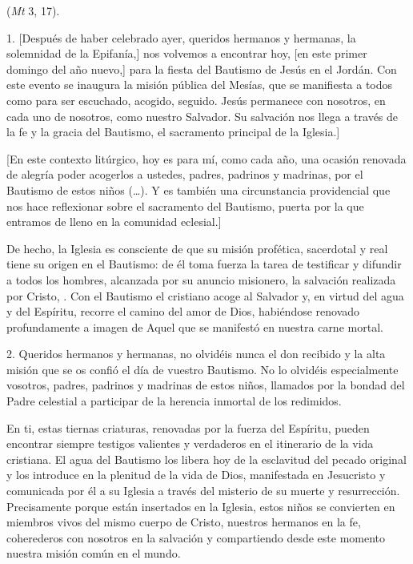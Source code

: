 				\begin{body}
					 (\emph{Mt} 3, 17).
					
					1. {[}Después de haber celebrado ayer, queridos hermanos y hermanas, la solemnidad de la Epifanía,{]} nos volvemos a encontrar hoy, {[}en este primer domingo del año nuevo,{]} para la fiesta del Bautismo de Jesús en el Jordán. Con este evento se inaugura la misión pública del Mesías, que se manifiesta a todos como  para ser escuchado, acogido, seguido. Jesús permanece con nosotros, en cada uno de nosotros, como nuestro Salvador. Su salvación nos llega a través de la fe y la gracia del Bautismo, el sacramento principal de la Iglesia.{]}
					
					{[}En este contexto litúrgico, hoy es para mí, como cada año, una ocasión renovada de alegría poder acogerlos a ustedes, padres, padrinos y madrinas, por el Bautismo de estos niños (\ldots{}). Y es también una circunstancia providencial que nos hace reflexionar sobre el sacramento del Bautismo, puerta por la que entramos de lleno en la comunidad eclesial.{]}
					
					De hecho, la Iglesia es consciente de que su misión profética, sacerdotal y real tiene su origen en el Bautismo: de él toma fuerza la tarea de testificar y difundir a todos los hombres, alcanzada por su anuncio misionero, la salvación realizada por Cristo, . Con el Bautismo el cristiano acoge al Salvador y, en virtud del agua y del Espíritu, recorre el camino del amor de Dios, habiéndose renovado profundamente a imagen de Aquel que se manifestó en nuestra carne mortal.
					
					2. Queridos hermanos y hermanas, no olvidéis nunca el don recibido y la alta misión que se os confió el día de vuestro Bautismo. No lo olvidéis especialmente vosotros, padres, padrinos y madrinas de estos niños, llamados por la bondad del Padre celestial a participar de la herencia inmortal de los redimidos.
					
					En ti, estas tiernas criaturas, renovadas por la fuerza del Espíritu, pueden encontrar siempre testigos valientes y verdaderos  en el itinerario de la vida cristiana. El agua del Bautismo los libera hoy de la esclavitud del pecado original y los introduce en la plenitud de la vida de Dios, manifestada en Jesucristo y comunicada por él a su Iglesia a través del misterio de su muerte y resurrección. Precisamente porque están insertados en la Iglesia, estos niños se convierten en miembros vivos del mismo cuerpo de Cristo, nuestros hermanos en la fe, coherederos con nosotros en la salvación y compartiendo desde este momento nuestra misión común en el mundo.
					

\end{body}
